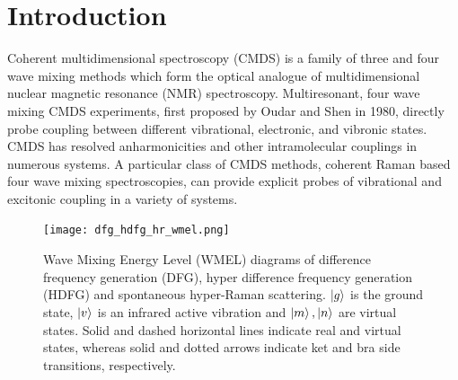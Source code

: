 \documentclass[aip, jcp, reprint, onecolumn]{revtex4-2}
\begin{document}
\section{Introduction}
Coherent multidimensional spectroscopy (CMDS) is a family of three and four wave mixing methods which form the optical analogue of multidimensional nuclear magnetic resonance (NMR) spectroscopy.\cite{Cho2008, RN335}
Multiresonant, four wave mixing CMDS experiments, first proposed by Oudar and Shen in 1980,\cite{RN307} directly probe coupling between different vibrational, electronic, and vibronic states. \cite{RN307, RN281, RN342, Cho2008, RN335, Ogilvie2019, RN325} 
CMDS has resolved anharmonicities and other intramolecular couplings in numerous systems. \cite{RN345, RN342, RN343, RN324, RN329, RN120, Czech2015, Gaynor2017, Ogilvie2019, RN325}
A particular class of CMDS methods, coherent Raman based four wave mixing spectroscopies, can provide explicit probes of vibrational and excitonic coupling in a variety of systems.

\begin{figure}[!htbp]
	\centering
	\texttt{[image: dfg\_hdfg\_hr\_wmel.png]}
	\caption{Wave Mixing Energy Level (WMEL) diagrams of difference frequency generation (DFG), hyper difference frequency generation (HDFG) and spontaneous hyper-Raman scattering. \cite{RN286, RN352}
		$\ket{g}$ is the ground state, $\ket{v}$ is an infrared active vibration and $\ket{m}, \ket{n}$ are virtual states.
		Solid and dashed horizontal lines indicate real and virtual states, whereas solid and dotted arrows indicate ket and bra side transitions, respectively. %
		}
	\label{fig:comparisonwmel}
\end{figure}
\end{document}
